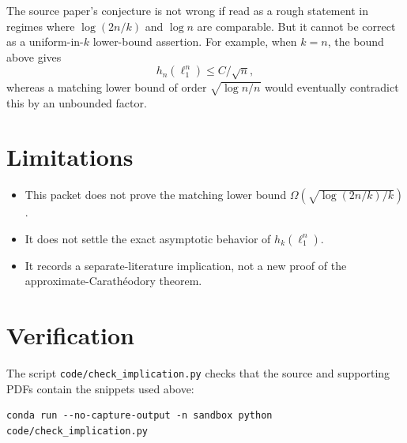 \documentclass[11pt]{article}
\theoremstyle{remark}
\begin{document}
The source paper's conjecture is not wrong if read as a rough statement in
regimes where \(\log(2n/k)\) and \(\log n\) are comparable.  But it cannot be
correct as a uniform-in-\(k\) lower-bound assertion.  For example, when
\(k=n\), the bound above gives
\[
  h_n(\ell_1^n)\le C/\sqrt n,
\]
whereas a matching lower bound of order \(\sqrt{\log n/n}\) would eventually
contradict this by an unbounded factor.

\section{Limitations}

\begin{itemize}[leftmargin=*]
\item This packet does not prove the matching lower bound
  \(\Omega(\sqrt{\log(2n/k)/k})\).
\item It does not settle the exact asymptotic behavior of \(h_k(\ell_1^n)\).
\item It records a separate-literature implication, not a new proof of the
  approximate-Carath\'eodory theorem.
\end{itemize}

\section{Verification}

The script \texttt{code/check\_implication.py} checks that the source and
supporting PDFs contain the snippets used above:

\begin{verbatim}
conda run --no-capture-output -n sandbox python code/check_implication.py
\end{verbatim}
\end{document}

